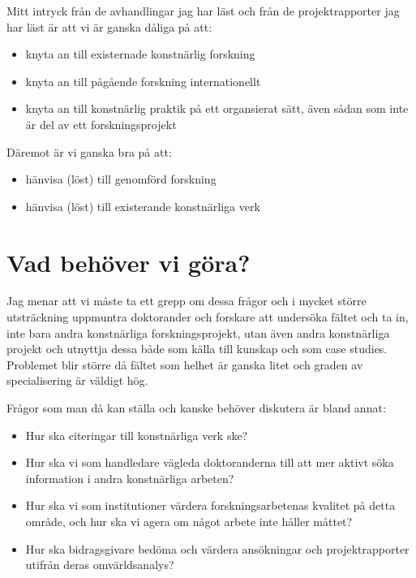 \documentclass{article}
\begin{document}
Mitt intryck från de avhandlingar jag har läst och från de projektrapporter jag har läst är att vi är ganska dåliga på att:

\begin{itemize}
\item knyta an till existernade konstnärlig forskning
\item knyta an till pågående forskning internationellt
\item knyta an till konstnärlig praktik på ett organsierat sätt, även sådan som inte är del av ett forskningsprojekt
\end{itemize}

Däremot är vi ganska bra på att:

\begin{itemize}
\item hänvisa (löst) till genomförd forskning
\item hänvisa (löst) till existerande konstnärliga verk
\end{itemize}

\section{Vad behöver vi göra?}

Jag menar att vi måste ta ett grepp om dessa frågor och i mycket större utsträckning uppmuntra doktorander och forskare att undersöka fältet och ta in, inte bara andra konstnärliga forskningsprojekt, utan även andra konstnärliga projekt och utnyttja dessa både som källa till kunskap och som case studies. Problemet blir större då fältet som helhet är ganska litet och graden av specialisering är väldigt hög. 

Frågor som man då kan ställa och kanske behöver diskutera är bland annat:

\begin{itemize}
\item Hur ska citeringar till konstnärliga verk ske?
\item Hur ska vi som handledare vägleda doktoranderna till att mer aktivt söka information i andra konstnärliga arbeten?
\item Hur ska vi som institutioner värdera forskningsarbetenas kvalitet på detta område, och hur ska vi agera om något arbete inte håller måttet?
\item Hur ska bidragsgivare bedöma och värdera ansökningar och projektrapporter utifrån deras omvärldsanalys?
\end{itemize}
\end{document}
